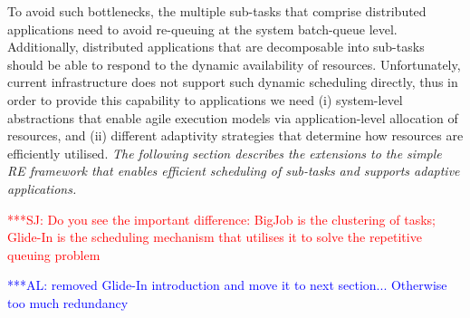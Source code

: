 \documentclass{rspublic}
\newcommand{\alnote}[1]{ {\textcolor{blue} { ***AL: #1 }}}
\newcommand{\jhanote}[1]{ {\textcolor{red} { ***SJ: #1 }}}
\newcommand{\alnote}[1]{}
\newcommand{\jhanote}[1]{}
\begin{document}
To avoid such bottlenecks, the multiple sub-tasks that comprise
distributed applications need to avoid re-queuing at the system
batch-queue level.  Additionally, distributed applications that are
decomposable into sub-tasks should be able to respond to the dynamic
availability of resources.  Unfortunately, current infrastructure does
not support such dynamic scheduling directly, thus in order to provide
this capability to applications we need (i) system-level abstractions
that enable agile execution models via application-level allocation of
resources, and (ii) different adaptivity strategies that determine how
resources are efficiently utilised.
{\it The following section describes the extensions to the simple RE
  framework that enables efficient scheduling of sub-tasks and
  supports adaptive applications.}




\jhanote{Do you see the important difference: BigJob is the clustering
  of tasks; Glide-In is the scheduling mechanism that utilises it to
  solve the repetitive queuing problem}

\alnote{removed Glide-In introduction and move it to next
  section... Otherwise too much redundancy}


\end{document}
